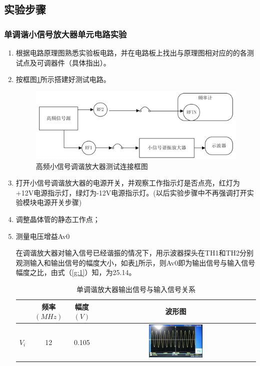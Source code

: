 \documentclass[12pt]{article}%
\numberwithin{equation}{section}
\begin{document}
\subsection{实验步骤}
\subsubsection{单调谐小信号放大器单元电路实验}
\begin{enumerate}[1.]\addtolength{\itemsep}{-1.5ex}
\item 根据电路原理图熟悉实验板电路，并在电路板上找出与原理图相对应的的各测试点及可调器件（具体指出）。
\item 按框图\ref{img22}所示搭建好测试电路。
  \begin{figure}[ht]
  \centering
  \includegraphics[width=\textwidth]{image000.png} 
  \caption{ 高频小信号调谐放大器测试连接框图} 
  \label{img22} 
\end{figure}
\item 打开小信号调谐放大器的电源开关，并观察工作指示灯是否点亮，红灯为+12V电源指示灯，绿灯为-12V电源指示灯。(以后实验步骤中不再强调打开实验模块电源开关步骤)
\item 调整晶体管的静态工作点；
\item 测量电压增益Av0\par
在调谐放大器对输入信号已经谐振的情况下，用示波器探头在TH1和TH2分别观测输入和输出信号的幅度大小，如表\ref{my-label1:a}所示，则Av0即为输出信号与输入信号幅度之比，由式（\ref{g:1}）知，为25.14。
\begin{table}[htbp]
\centering
\caption{单调谐放大器输出信号与输入信号关系}
\label{my-label1:a}
\begin{tabular}{|c|c|c|c|}
\hline
      & 频率$(MHz)$ & 幅度$(V)$ & 波形图 \\ \hline
$V_i$ & 12        & 0.105   &\includegraphics[width=0.35\textwidth]{gaopin2/gaopin209.jpg}    \\ \hline

\end{tabular}
\end{table}
\end{enumerate}
\end{document}
